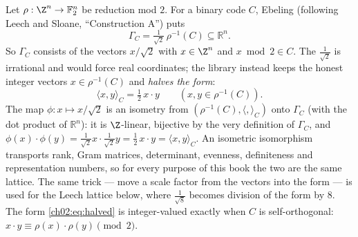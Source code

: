 Let $\rho:\Z^n\to\chtwoF^n$ be reduction mod $2$.  For a binary code $C$, Ebeling (following
Leech and Sloane, ``Construction A'') puts
\begin{equation*}
\Gamma_C=\tfrac1{\sqrt2}\,\rho^{-1}(C)\subseteq\mathbb{R}^n .
\end{equation*}
So $\Gamma_C$ consists of the vectors $x/\sqrt2$ with $x\in\Z^n$ and $x\bmod2\in C$.  The
$\tfrac1{\sqrt2}$ is irrational and would force real coordinates; the library instead keeps
the honest integer vectors $x\in\rho^{-1}(C)$ and \emph{halves the form}:
\begin{equation}\label{ch02:eq:halved}
\langle x,y\rangle_C=\tfrac12\,x\cdot y\qquad(x,y\in\rho^{-1}(C)).
\end{equation}
The map $\phi:x\mapsto x/\sqrt2$ is an isometry from $(\rho^{-1}(C),\langle,\rangle_C)$ onto
$\Gamma_C$ (with the dot product of $\mathbb{R}^n$): it is $\Z$-linear, bijective by the very
definition of $\Gamma_C$, and
$\phi(x)\cdot\phi(y)=\tfrac1{\sqrt2}x\cdot\tfrac1{\sqrt2}y=\tfrac12\,x\cdot y=\langle
x,y\rangle_C$.  An isometric isomorphism transports rank, Gram matrices, determinant, evenness,
definiteness and representation numbers, so for every purpose of this book the two are the same
lattice.  The same trick --- move a scale factor from the vectors into the form --- is used for
the Leech lattice below, where $\tfrac1{\sqrt8}$ becomes division of the form by $8$.  The form \eqref{ch02:eq:halved} is integer-valued
exactly when $C$ is self-orthogonal: $x\cdot y\equiv\rho(x)\cdot\rho(y)\pmod 2$.

